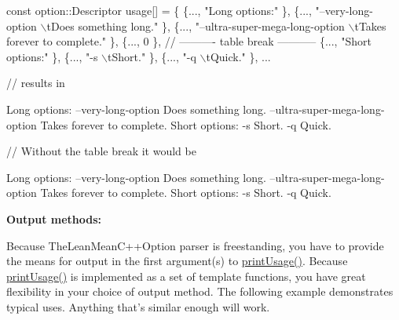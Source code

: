 \begin{DoxyCode}
\textcolor{keyword}{const} option::Descriptor usage[] = \{
\{..., \textcolor{stringliteral}{"Long options:"} \},
\{..., \textcolor{stringliteral}{"--very-long-option  \(\backslash\)tDoes something long."} \},
\{..., \textcolor{stringliteral}{"--ultra-super-mega-long-option  \(\backslash\)tTakes forever to complete."} \},
\{..., 0 \}, \textcolor{comment}{// ---------- table break -----------}
\{..., \textcolor{stringliteral}{"Short options:"} \},
\{..., \textcolor{stringliteral}{"-s  \(\backslash\)tShort."} \},
\{..., \textcolor{stringliteral}{"-q  \(\backslash\)tQuick."} \}, ...

\textcolor{comment}{// results in}

Long options:
--very-\textcolor{keywordtype}{long}-option              Does something \textcolor{keywordtype}{long}.
--ultra-super-mega-\textcolor{keywordtype}{long}-option  Takes forever to complete.
Short options:
-s  Short.
-q  Quick.

\textcolor{comment}{// Without the table break it would be}

Long options:
--very-\textcolor{keywordtype}{long}-option              Does something \textcolor{keywordtype}{long}.
--ultra-super-mega-\textcolor{keywordtype}{long}-option  Takes forever to complete.
Short options:
-s                              Short.
-q                              Quick.
\end{DoxyCode}


{\bfseries Output methods\-:}

Because The\-Lean\-Mean\-C++\-Option parser is freestanding, you have to provide the means for output in the first argument(s) to \hyperlink{namespace_option_parser_a2458d437c7f439220d0b3581a5db56b1}{print\-Usage()}. Because \hyperlink{namespace_option_parser_a2458d437c7f439220d0b3581a5db56b1}{print\-Usage()} is implemented as a set of template functions, you have great flexibility in your choice of output method. The following example demonstrates typical uses. Anything that's similar enough will work.


